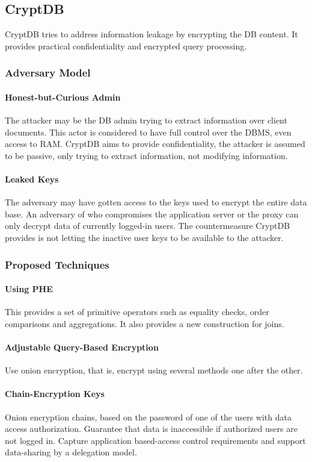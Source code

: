 \subsection{CryptDB}
CryptDB tries to address information leakage by encrypting the DB content.
It provides practical confidentiality and encrypted query processing.

\subsubsection{Adversary Model}
\paragraph{Honest-but-Curious Admin}
The attacker may be the DB admin trying to extract information over client documents.
This actor is considered to have full control over the DBMS, even access to RAM.
CryptDB aims to provide confidentiality, the attacker is assumed to be passive,
only trying to extract information, not modifying information.

\paragraph{Leaked Keys}
The adversary may have gotten access to the keys used to encrypt the entire data base.
An adversary of who compromises the application server or the proxy can only decrypt data of currently logged-in users.
The countermeasure CryptDB provides is not letting the inactive user keys to be available to the attacker.

\subsubsection{Proposed Techniques}
\paragraph{Using PHE}
This provides a set of primitive operators such as equality checks, order comparisons and aggregations.
It also provides a new construction for joins.

\paragraph{Adjustable Query-Based Encryption}
Use onion encryption, that is, encrypt using several methods one after the other.

\paragraph{Chain-Encryption Keys}
Onion encryption chains, based on the password of one of the users with data access authorization.
Guarantee that data is inaccessible if authorized users are not logged in.
Capture application based-access control requirements and support data-sharing by a delegation model.

